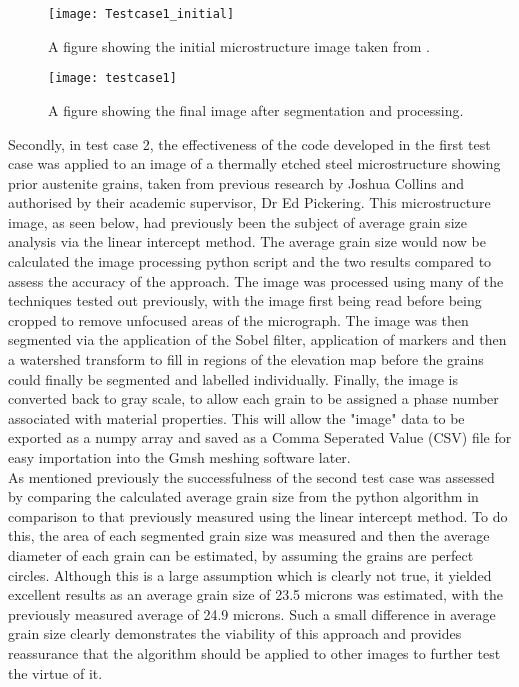 \documentclass[\report.tex]{subfiles}
\begin{document}
\begin{figure}
  \centering
  \begin{minipage}[!htb]{.5\textwidth}
    \centering\captionsetup{width=.8\linewidth}%
    \texttt{[image: Testcase1\_initial]}
    \caption{A figure showing the initial microstructure image taken from \cite{CallisterJrWilliamD2000MSaE}.}\label{fig:Testcase1}
  \end{minipage}%
  \begin{minipage}[!htb]{.5\textwidth}
    \centering\captionsetup{width=.8\linewidth}%
    \texttt{[image: testcase1]}
    \caption{A figure showing the final image after segmentation and processing.}\label{fig:Testcase1_2}
  \end{minipage}
\end{figure}


\noindent Secondly, in test case 2, the effectiveness of the code developed in the first test case was applied to an image of a thermally etched steel microstructure showing prior austenite grains, taken from previous research by Joshua Collins and authorised by their academic supervisor, Dr Ed Pickering. This microstructure image, as seen below, had previously been the subject of average grain size analysis via the linear intercept method. The average grain size would now be calculated the image processing python script and the two results compared to assess the accuracy of the approach. The image was processed using many of the techniques tested out previously, with the image first being read before being cropped to remove unfocused areas of the micrograph. The image was then segmented via the application of the Sobel filter, application of markers and then a watershed transform to fill in regions of the elevation map before the grains could finally be segmented and labelled individually. Finally, the image is converted back to gray scale, to allow each grain to be assigned a phase number associated with material properties. This will allow the "image" data to be exported as a numpy array and saved as a Comma Seperated Value (CSV) file for easy importation into the Gmsh meshing software later.\\

\noindent As mentioned previously the successfulness of the second test case was assessed by comparing the calculated average grain size from the python algorithm in comparison to that previously measured using the linear intercept method. To do this, the area of each segmented grain size was measured and then the average diameter of each grain can be estimated, by assuming the grains are perfect circles. Although this is a large assumption which is clearly not true, it yielded excellent results as an average grain size of 23.5 microns was estimated, with the previously measured average of 24.9 microns. Such a small difference in average grain size clearly demonstrates the viability of this approach and provides reassurance that the algorithm should be applied to other images to further test the virtue of it.\\
\end{document}
